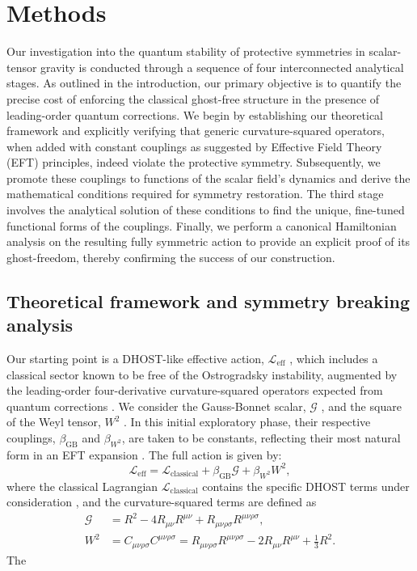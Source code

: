 \documentclass[twocolumn]{aastex631}
\begin{document}
\section{Methods}
\label{sec:methods}
Our investigation into the quantum stability of protective symmetries in scalar-tensor gravity is conducted through a sequence of four interconnected analytical stages. As outlined in the introduction, our primary objective is to quantify the precise cost of enforcing the classical ghost-free structure in the presence of leading-order quantum corrections. We begin by establishing our theoretical framework and explicitly verifying that generic curvature-squared operators, when added with constant couplings as suggested by Effective Field Theory (EFT) principles, indeed violate the protective symmetry. Subsequently, we promote these couplings to functions of the scalar field's dynamics and derive the mathematical conditions required for symmetry restoration. The third stage involves the analytical solution of these conditions to find the unique, fine-tuned functional forms of the couplings. Finally, we perform a canonical Hamiltonian analysis on the resulting fully symmetric action to provide an explicit proof of its ghost-freedom, thereby confirming the success of our construction.\subsection{Theoretical framework and symmetry breaking analysis}Our starting point is a DHOST-like effective action, $\mathcal{L}_{\text{eff}}$ \citep{achour2020rotatingblackholesdhost}, which includes a classical sector known to be free of the Ostrogradsky instability, augmented by the leading-order four-derivative curvature-squared operators expected from quantum corrections \citep{eichhorn2025purelymetrichorndeskitheories,eichhorn2025purelymetrichorndeskitheories}. We consider the Gauss-Bonnet scalar, $\mathcal{G}$ \citep{eichhorn2025purelymetrichorndeskitheories}, and the square of the Weyl tensor, $W^2$ \citep{cheung2017positivitycurvaturesquaredcorrectionsgravity}. In this initial exploratory phase, their respective couplings, $\beta_{\text{GB}}$ and $\beta_{W^2}$, are taken to be constants, reflecting their most natural form in an EFT expansion \citep{cheung2017positivitycurvaturesquaredcorrectionsgravity,calmet2017gravitationaleffectiveactionsecond}. The full action is given by:\begin{equation}\mathcal{L}_{\text{eff}} = \mathcal{L}_{\text{classical}} + \beta_{\text{GB}} \mathcal{G} + \beta_{W^2} W^2,\end{equation}where the classical Lagrangian $\mathcal{L}_{\text{classical}}$ contains the specific DHOST terms under consideration \citep{ilyas2020dhostbounce,colléaux2024classificationgeneralisedhigherordereinsteinmaxwell}, and the curvature-squared terms are defined as\begin{align}\mathcal{G} &= R^2 - 4 R_{\mu\nu}R^{\mu\nu} + R_{\mu\nu\rho\sigma}R^{\mu\nu\rho\sigma}, \\W^2 &= C_{\mu\nu\rho\sigma}C^{\mu\nu\rho\sigma} = R_{\mu\nu\rho\sigma}R^{\mu\nu\rho\sigma} - 2 R_{\mu\nu}R^{\mu\nu} + \frac{1}{3}R^2.\end{align}The 
\end{document}
